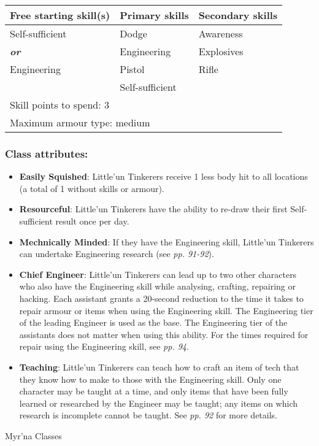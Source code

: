 \begin{table}[H]
\begin{tabular}{|l|l|l|} \hline 
Free starting skill(s) & Primary skills & Secondary skills \\
 \hline Self-sufficient & Dodge & Awareness \\
 \hline \textbf{\textit{or}} & Engineering & Explosives \\
 \hline Engineering & Pistol & Rifle \\
 \hline  & Self-sufficient &  \\
 \hline \multicolumn{3}{|l|}{Skill points to spend: 3} \\
 \hline \multicolumn{3}{|l|}{Maximum armour type: medium} \\
 \hline \end{tabular}

\end{table}

\subsubsection{Class attributes:}

\begin{itemize}
\item \textbf{Easily Squished}: Little'un Tinkerers receive 1 less body hit to all locations (a total of 1 without skills or armour).

\item \textbf{Resourceful}: Little'un Tinkerers have the ability to re-draw their first Self-sufficient result once per day.

\item \textbf{Mechnically Minded}: If they have the Engineering skill, Little'un Tinkerers can undertake Engineering research (see \textit{pp. 91-92}).

\item \textbf{Chief Engineer}: Little'un Tinkerers can lead up to two other characters who also have the Engineering skill while analysing, crafting, repairing or hacking. Each assistant grants a 20-second reduction to the time it takes to repair armour or items when using the Engineering skill. The Engineering tier of the leading Engineer is used as the base. The Engineering tier of the assistants does not matter when using this ability. For the times required for repair using the Engineering skill, see \textit{pp. 94}.

\item \textbf{Teaching}: Little'un Tinkerers can teach how to craft an item of tech that they know how to make to those with the Engineering skill. Only one character may be taught at a time, and only items that have been fully learned or researched by the Engineer may be taught; any items on which research is incomplete cannot be taught. See \textit{pp. 92} for more details.

\end{itemize}
Myr'na Classes

